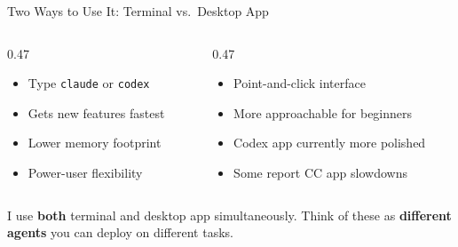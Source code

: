 \documentclass[aspectratio=169, 10pt]{beamer}
\begin{document}
\begin{frame}{Two Ways to Use It: Terminal vs.\ Desktop App}
\begin{columns}[T]
\begin{column}{0.47\textwidth}
\begin{tcolorbox}[keybox, title={\faTerminal\quad Terminal (CLI)}]
\small
\begin{itemize}\setlength{\itemsep}{1pt}
  \item Type \texttt{claude} or \texttt{codex}
  \item Gets new features fastest
  \item Lower memory footprint
  \item Power-user flexibility
\end{itemize}
\end{tcolorbox}
\end{column}
\begin{column}{0.47\textwidth}
\begin{tcolorbox}[keybox, title={\faDesktop\quad Desktop App}]
\small
\begin{itemize}\setlength{\itemsep}{1pt}
  \item Point-and-click interface
  \item More approachable for beginners
  \item Codex app currently more polished
  \item Some report CC app slowdowns
\end{itemize}
\end{tcolorbox}
\end{column}
\end{columns}
\vskip6pt
\pause
\begin{tcolorbox}[quotebox, width=12cm]
\small I use \textbf{both} terminal and desktop app simultaneously. Think of these as \textbf{different agents} you can deploy on different tasks.
\end{tcolorbox}
\end{frame}
\end{document}
